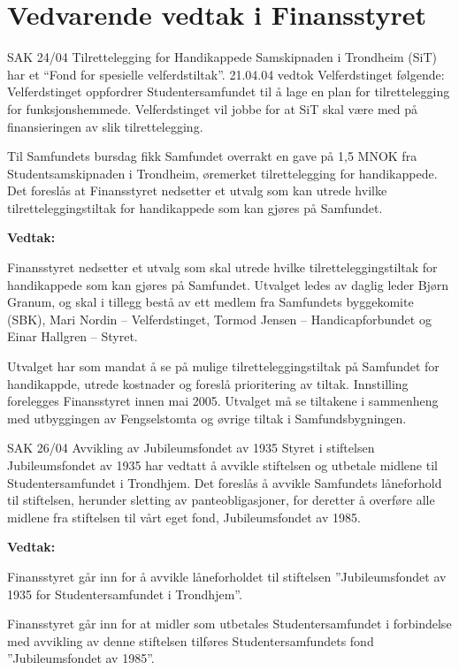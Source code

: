 \documentclass[fsbok.tex]{subfiles}
\begin{document}
\chapter*{Vedvarende vedtak i Finansstyret}

\begin{instruksledd}{SAK 24/04 Tilrettelegging for Handikappede}
    Samskipnaden i Trondheim (SiT) har et ``Fond for spesielle velferdstiltak''. 21.04.04
    vedtok Velferdstinget følgende:
    Velferdstinget oppfordrer Studentersamfundet til å lage en plan for tilrettelegging
    for funksjonshemmede.
    Velferdstinget vil jobbe for at SiT skal være med på finansieringen av slik
    tilrettelegging.
    
    Til Samfundets bursdag fikk Samfundet overrakt en gave på 1,5 MNOK fra
    Studentsamskipnaden i Trondheim,
    øremerket tilrettelegging for handikappede.
    Det foreslås at Finansstyret nedsetter et utvalg som kan utrede hvilke
    tilretteleggingstiltak for handikappede som kan
    gjøres på Samfundet.


    \textbf{Vedtak:}

    Finansstyret nedsetter et utvalg som skal utrede hvilke tilretteleggingstiltak for
    handikappede som kan gjøres på
    Samfundet. Utvalget ledes av daglig leder Bjørn Granum, og skal i tillegg bestå av ett
    medlem fra Samfundets
    byggekomite (SBK), Mari Nordin – Velferdstinget, Tormod Jensen – Handicapforbundet og
    Einar Hallgren – Styret.
    
    Utvalget har som mandat å se på mulige tilretteleggingstiltak på Samfundet for
    handikappde, utrede kostnader og
    foreslå prioritering av tiltak. Innstilling forelegges Finansstyret innen mai 2005.
    Utvalget må se tiltakene i sammenheng med utbyggingen av Fengselstomta og øvrige
    tiltak i Samfundsbygningen.

\end{instruksledd}

\begin{instruksledd}{SAK 26/04 Avvikling av Jubileumsfondet av 1935}
    Styret i stiftelsen Jubileumsfondet av 1935 har vedtatt å avvikle stiftelsen og
    utbetale midlene til Studentersamfundet i
    Trondhjem. Det foreslås å avvikle Samfundets låneforhold til stiftelsen, herunder
    sletting av panteobligasjoner, for
    deretter å overføre alle midlene fra stiftelsen til vårt eget fond, Jubileumsfondet av
    1985.

    \textbf{Vedtak:}

    Finansstyret går inn for å avvikle låneforholdet til stiftelsen ”Jubileumsfondet av
    1935 for Studentersamfundet i
    Trondhjem”.
    
    Finansstyret går inn for at midler som utbetales Studentersamfundet i forbindelse med
    avvikling av denne stiftelsen
    tilføres Studentersamfundets fond ”Jubileumsfondet av 1985”.

\end{instruksledd}
\end{document}
